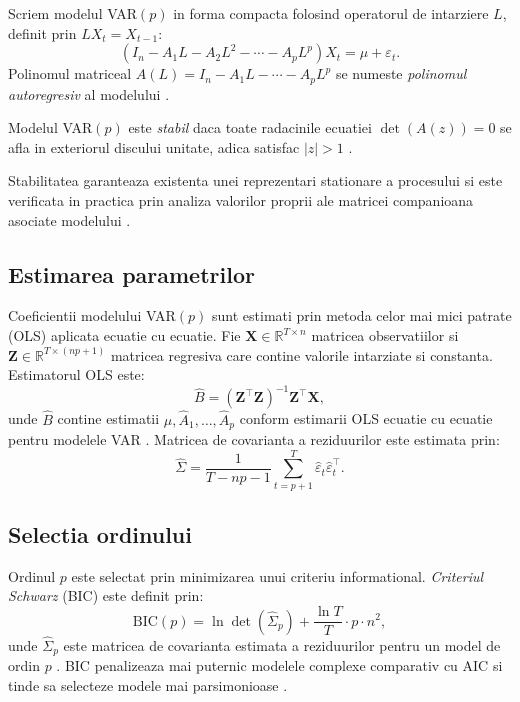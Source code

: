 Scriem modelul VAR$(p)$ in forma compacta folosind operatorul de intarziere $L$,
definit prin $L X_t = X_{t-1}$:
\[
    \left(I_n - A_1 L - A_2 L^2 - \cdots - A_p L^p\right) X_t = \mu + \varepsilon_t.
\]
Polinomul matriceal $A(L) = I_n - A_1 L - \cdots - A_p L^p$ se numeste
\textit{polinomul autoregresiv} al modelului \citep{lutkepohl2005}.

\begin{definition}
Modelul VAR$(p)$ este \textit{stabil} daca toate radacinile ecuatiei
$\det(A(z)) = 0$ se afla in exteriorul discului unitate, adica satisfac
$|z| > 1$ \citep{lutkepohl2005}.
\end{definition}

Stabilitatea garanteaza existenta unei reprezentari stationare a procesului si
este verificata in practica prin analiza valorilor proprii ale matricei
companioana asociate modelului \citep{lutkepohl2005}.

\subsection{Estimarea parametrilor}

Coeficientii modelului VAR$(p)$ sunt estimati prin metoda celor mai mici patrate
(OLS) aplicata ecuatie cu ecuatie. Fie $\mathbf{X} \in \mathbb{R}^{T \times n}$
matricea observatiilor si $\mathbf{Z} \in \mathbb{R}^{T \times (np+1)}$ matricea
regresiva care contine valorile intarziate si constanta. Estimatorul OLS este:
\begin{equation}
    \hat{B} = (\mathbf{Z}^\top \mathbf{Z})^{-1} \mathbf{Z}^\top \mathbf{X},
    \label{eq:ols}
\end{equation}
unde $\hat{B}$ contine estimatii $\hat{\mu}, \hat{A}_1, \ldots, \hat{A}_p$ conform estimarii OLS ecuatie cu ecuatie pentru modelele VAR \citep{lutkepohl2005}.
Matricea de covarianta a reziduurilor este estimata prin:
\[
    \hat{\Sigma} = \frac{1}{T - np - 1} \sum_{t=p+1}^{T} \hat{\varepsilon}_t \hat{\varepsilon}_t^\top.
\]

\subsection{Selectia ordinului}

Ordinul $p$ este selectat prin minimizarea unui criteriu informational.
\textit{Criteriul Schwarz} (BIC) este definit prin:
\begin{equation}
    \mathrm{BIC}(p) = \ln \det(\hat{\Sigma}_p) + \frac{\ln T}{T} \cdot p \cdot n^2,
    \label{eq:bic}
\end{equation}
unde $\hat{\Sigma}_p$ este matricea de covarianta estimata a reziduurilor pentru
un model de ordin $p$ \citep{lutkepohl2005}. BIC penalizeaza mai puternic modelele complexe comparativ
cu AIC si tinde sa selecteze modele mai parsimonioase \citep{lutkepohl2005}.

